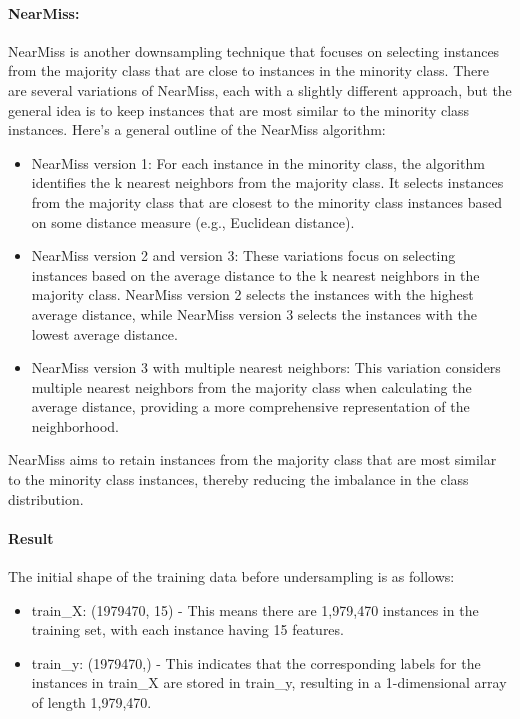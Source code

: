 \documentclass{article}
\begin{document}
 \paragraph{NearMiss:}
 NearMiss is another downsampling technique that focuses on selecting instances from the majority class that are close to instances in the minority class. There are several variations of NearMiss, each with a slightly different approach, but the general idea is to keep instances that are most similar to the minority class instances. Here's a general outline of the NearMiss algorithm:
        \begin{itemize}
            \item NearMiss version 1: For each instance in the minority class, the algorithm identifies the k nearest neighbors from the majority class. It selects instances from the majority class that are closest to the minority class instances based on some distance measure (e.g., Euclidean distance).
            \item NearMiss version 2 and version 3: These variations focus on selecting instances based on the average distance to the k nearest neighbors in the majority class. NearMiss version 2 selects the instances with the highest average distance, while NearMiss version 3 selects the instances with the lowest average distance.
            \item NearMiss version 3 with multiple nearest neighbors: This variation considers multiple nearest neighbors from the majority class when calculating the average distance, providing a more comprehensive representation of the neighborhood.
        \end{itemize}
NearMiss aims to retain instances from the majority class that are most similar to the minority class instances, thereby reducing the imbalance in the class distribution.

\hfill


\paragraph{Result}
The initial shape of the training data before undersampling is as follows:

\begin{itemize}
    \item train\_X: (1979470, 15) - This means there are 1,979,470 instances in the training set, with each instance having 15 features.
    \item train\_y: (1979470,) - This indicates that the corresponding labels for the instances in train\_X are stored in train\_y, resulting in a 1-dimensional array of length 1,979,470.
\end{itemize}
\end{document}
